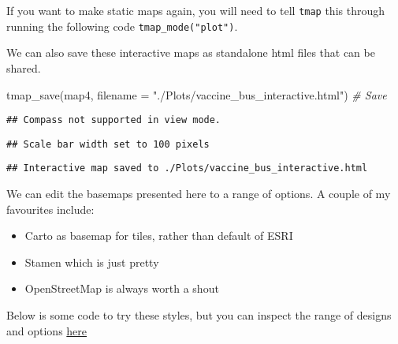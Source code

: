 \documentclass[
]{book}
\newenvironment{Shaded}{\begin{snugshade}}{\end{snugshade}}
\newcommand{\AttributeTok}[1]{\textcolor[rgb]{0.77,0.63,0.00}{#1}}
\newcommand{\CommentTok}[1]{\textcolor[rgb]{0.56,0.35,0.01}{\textit{#1}}}
\newcommand{\FunctionTok}[1]{\textcolor[rgb]{0.00,0.00,0.00}{#1}}
\newcommand{\NormalTok}[1]{#1}
\newcommand{\StringTok}[1]{\textcolor[rgb]{0.31,0.60,0.02}{#1}}
\providecommand{\tightlist}{%
  \setlength{\itemsep}{0pt}\setlength{\parskip}{0pt}}
\begin{document}
If you want to make static maps again, you will need to tell \texttt{tmap} this through running the following code \texttt{tmap\_mode("plot")}.

We can also save these interactive maps as standalone html files that can be shared.

\begin{Shaded}
\begin{Highlighting}[]
\FunctionTok{tmap\_save}\NormalTok{(map4, }\AttributeTok{filename =} \StringTok{"./Plots/vaccine\_bus\_interactive.html"}\NormalTok{) }\CommentTok{\# Save}
\end{Highlighting}
\end{Shaded}

\begin{verbatim}
## Compass not supported in view mode.
\end{verbatim}

\begin{verbatim}
## Scale bar width set to 100 pixels
\end{verbatim}

\begin{verbatim}
## Interactive map saved to ./Plots/vaccine_bus_interactive.html
\end{verbatim}

We can edit the basemaps presented here to a range of options. A couple of my favourites include:

\begin{itemize}
\tightlist
\item
  Carto as basemap for tiles, rather than default of ESRI
\item
  Stamen which is just pretty
\item
  OpenStreetMap is always worth a shout
\end{itemize}

Below is some code to try these styles, but you can inspect the range of designs and options \href{https://leaflet-extras.github.io/leaflet-providers/preview/}{here}
\end{document}
